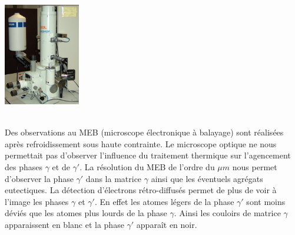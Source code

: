 \centerline{\includegraphics[width=0.25\textwidth]{images/JEOL_JSM-6340F.jpg}}
\\
Des observations au MEB (microscope électronique à balayage) sont réalisées après refroidissement sous haute contrainte. Le microscope optique ne nous permettait pas d'observer l'influence du traitement thermique sur l'agencement des phases $\gamma$ et de $\gamma'$. La résolution du MEB de l'ordre du $\mu m$ nous permet d'observer la phase $\gamma'$ dans la matrice $\gamma$ ainsi que les éventuels agrégats eutectiques. La détection d'électrons rétro-diffusés permet de plus de voir à l'image les phases $\gamma$ et $\gamma'$. En effet les atomes légers de la phase $\gamma'$ sont moins déviés que les atomes plus lourds de la phase $\gamma$. Ainsi les couloirs de matrice $\gamma$ apparaissent en blanc et la phase $\gamma'$ apparaît en noir.
\newpage

